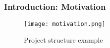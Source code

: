 \begin{frame}

\frametitle{Introduction: Motivation}

\begin{figure}[h]
\centering
\texttt{[image: motivation.png]}
\caption{Project structure example}
\label{fig:motivation}
\end{figure}

\end{frame}
